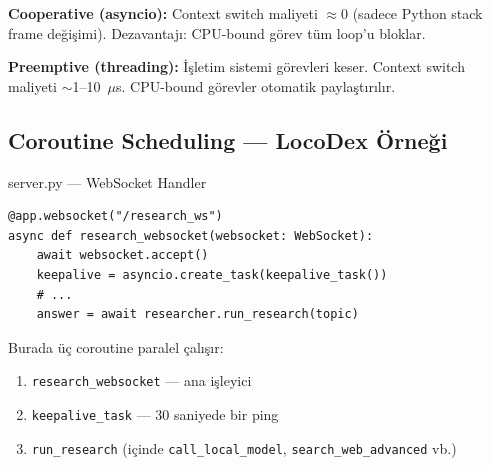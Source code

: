 \begin{formulbox}
\textbf{Cooperative (asyncio):} Context switch maliyeti $\approx 0$ (sadece Python stack frame de\u{g}i\c{s}imi). Dezavantaj{\i}: CPU-bound g\"{o}rev t\"{u}m loop'u bloklar.

\textbf{Preemptive (threading):} \.{I}\c{s}letim sistemi g\"{o}revleri keser. Context switch maliyeti $\sim$1--10~$\mu$s. CPU-bound g\"{o}revler otomatik payla\c{s}t{\i}r{\i}l{\i}r.
\end{formulbox}

\subsection{Coroutine Scheduling --- LocoDex \"{O}rne\u{g}i}
\label{sec:coroutine-scheduling}

\begin{kodref}{server.py --- WebSocket Handler}
\begin{lstlisting}
@app.websocket("/research_ws")
async def research_websocket(websocket: WebSocket):
    await websocket.accept()
    keepalive = asyncio.create_task(keepalive_task())
    # ...
    answer = await researcher.run_research(topic)
\end{lstlisting}
\end{kodref}

Burada \"{u}\c{c} coroutine paralel \c{c}al{\i}\c{s}{\i}r:
\begin{enumerate}
  \item \texttt{research\_websocket} --- ana i\c{s}leyici
  \item \texttt{keepalive\_task} --- 30 saniyede bir ping
  \item \texttt{run\_research} (i\c{c}inde \texttt{call\_local\_model}, \texttt{search\_web\_advanced} vb.)
\end{enumerate}

